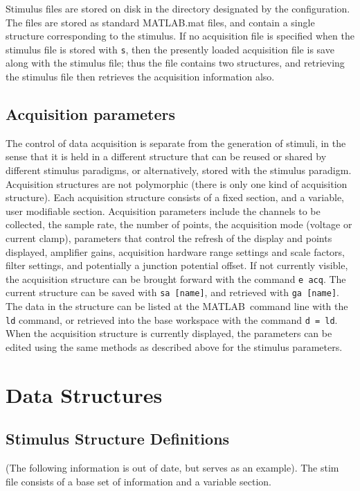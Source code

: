 \documentclass[11pt, letterpaper, titlepage]{paper}
\newcommand{\ml}{\textsf{MATLAB}}
\begin{document}
Stimulus files are stored on disk in the directory designated by 
the configuration. The files are stored as standard \ml.mat files, 
and contain a single structure corresponding to the stimulus. If 
no acquisition file is specified when the stimulus file is stored 
with \texttt{s}, then the presently loaded acquisition file is 
save along with the stimulus file; thus the file contains two 
structures, and retrieving the stimulus file then retrieves the 
acquisition information also.

\subsection{Acquisition parameters}

The control of data acquisition is separate from the generation of stimuli, in the sense 
that it is held in a different structure that can be reused or shared by different 
stimulus paradigms, or alternatively, stored with the stimulus paradigm. Acquisition 
structures are not polymorphic (there is only one kind of acquisition structure). Each 
acquisition structure consists of a fixed section, and a variable, user modifiable 
section. Acquisition parameters include the channels to be collected, the sample rate, 
the number of points, the acquisition mode (voltage or current clamp), parameters that 
control the refresh of the display and points displayed, amplifier gains, acquisition 
hardware range settings and scale factors, filter settings, and potentially a junction 
potential offset. If not currently visible, the acquisition structure can be brought 
forward with the command \texttt{e acq}. The current structure can be saved with \texttt 
{sa [name]}, and retrieved with \texttt{ga [name]}. The data in the structure can be 
listed at the \ml\ command line with the \texttt{ld} command, or retrieved into the base 
workspace with the command \texttt{d = ld}. When the acquisition structure is currently 
displayed, the parameters can be edited using the same methods as described above for the 
stimulus parameters.


\section{Data Structures}

\subsection{Stimulus Structure Definitions}
(The following information is out of date, but serves as an example).
The stim file 
consists of a base set of information and a variable section.
\end{document}

